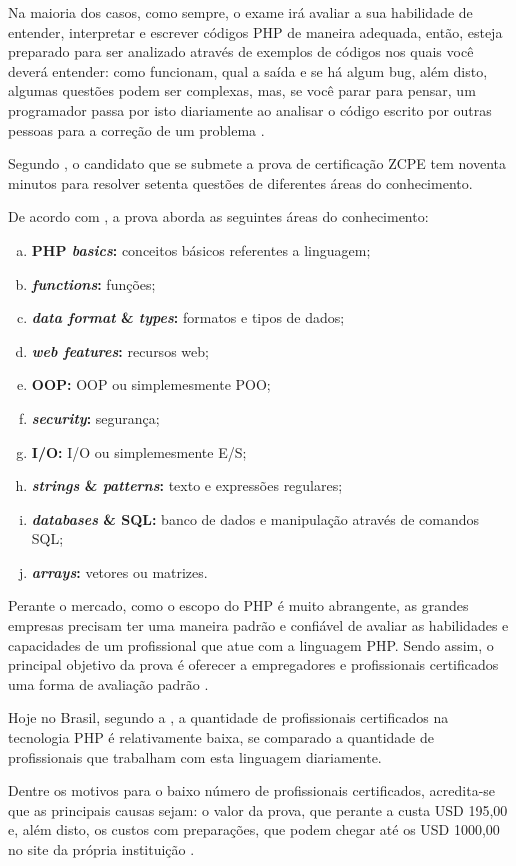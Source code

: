 Na maioria dos casos, como sempre, o exame irá avaliar a sua habilidade de
entender, interpretar e escrever códigos \acs{PHP} de maneira adequada, então,
esteja preparado para ser analizado através de exemplos de códigos nos quais
você deverá entender: como funcionam, qual a saída e se há algum \acs{bug},
além disto, algumas questões podem ser complexas, mas, se você parar para
pensar, um programador passa por isto diariamente ao analisar o código escrito
por outras pessoas para a correção de um problema
\cite{theZendPHPCertificationPracticeTestBook}.

Segundo , o candidato que se
submete a prova de certificação \acs{ZCPE} tem noventa minutos para resolver 
setenta questões de diferentes áreas do conhecimento.

De acordo com , a prova aborda as seguintes áreas do
conhecimento:

\begin{enumerate}[a)]
    \item \textbf{\acs{PHP} \textit{basics}:} 				conceitos básicos referentes a
    linguagem;
    \item \textbf{\textit{functions}:} 						funções;
    \item \textbf{\textit{data format} \& \textit{types}:} 	formatos e tipos de
    dados;
    \item \textbf{\textit{web features}:} 					recursos web;
    \item \textbf{\acs{OOP}:}								\acl{OOP} ou simplemesmente \ac{POO};
    \item \textbf{\textit{security}:} 						segurança;
    \item \textbf{\acs{I/O}:} 								\acl{I/O} ou simplemesmente \ac{E/S};
    \item \textbf{\textit{strings} \& \textit{patterns}:} 	texto e expressões
    regulares;
    \item \textbf{\textit{databases} \& \acs{SQL}:} 		banco de dados e
    manipulação através de comandos \ac{SQL};
    \item \textbf{\textit{arrays}:} 						vetores ou matrizes.
\end{enumerate}

Perante o mercado, como o escopo do PHP é muito abrangente, as grandes empresas
precisam ter uma maneira padrão e confiável de avaliar as habilidades e 
capacidades de um profissional que atue com a linguagem PHP. Sendo assim, o
principal objetivo da prova é oferecer a empregadores e profissionais 
certificados uma forma de avaliação padrão \cite{zendPhp5CertificationStudyGuide}.

Hoje no Brasil, segundo a , a 
quantidade de profissionais certificados na tecnologia PHP é relativamente 
baixa, se comparado a quantidade de profissionais que trabalham com esta 
linguagem diariamente.

Dentre os motivos para o baixo número de profissionais certificados, acredita-se
que as principais causas sejam: o valor da prova, que perante a 
 custa USD 195,00 e, além disto,  os
custos com preparações, que podem chegar até os USD 1000,00 no site da  própria
instituição \cite{websiteZendOnlineTraining}.
